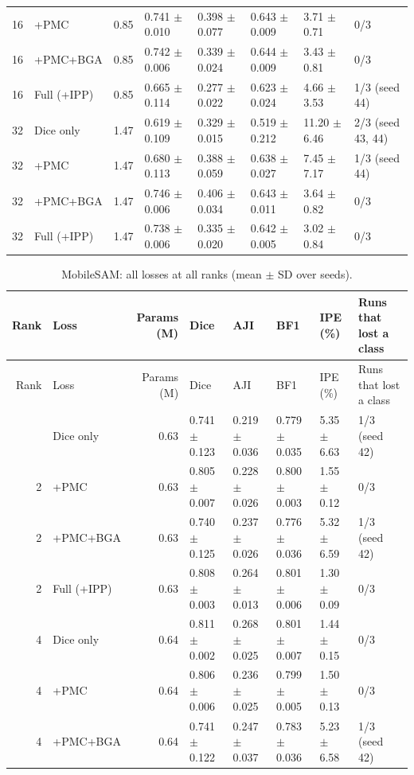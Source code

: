 \documentclass[10pt]{article}
\begin{document}
\begin{landscape}
{\begin{longtable}{r l r l l l l l}
16 & +PMC & 0.85 & 0.741 $\pm$ 0.010 & 0.398 $\pm$ 0.077 & 0.643 $\pm$ 0.009 & 3.71 $\pm$ 0.71 & 0/3 \\
16 & +PMC+BGA & 0.85 & 0.742 $\pm$ 0.006 & 0.339 $\pm$ 0.024 & 0.644 $\pm$ 0.009 & 3.43 $\pm$ 0.81 & 0/3 \\
16 & Full (+IPP) & 0.85 & 0.665 $\pm$ 0.114 & 0.277 $\pm$ 0.022 & 0.623 $\pm$ 0.024 & 4.66 $\pm$ 3.53 & 1/3 (seed 44) \\
32 & Dice only & 1.47 & 0.619 $\pm$ 0.109 & 0.329 $\pm$ 0.015 & 0.519 $\pm$ 0.212 & 11.20 $\pm$ 6.46 & 2/3 (seed 43, 44) \\
32 & +PMC & 1.47 & 0.680 $\pm$ 0.113 & 0.388 $\pm$ 0.059 & 0.638 $\pm$ 0.027 & 7.45 $\pm$ 7.17 & 1/3 (seed 44) \\
32 & +PMC+BGA & 1.47 & 0.746 $\pm$ 0.006 & 0.406 $\pm$ 0.034 & 0.643 $\pm$ 0.011 & 3.64 $\pm$ 0.82 & 0/3 \\
32 & Full (+IPP) & 1.47 & 0.738 $\pm$ 0.006 & 0.335 $\pm$ 0.020 & 0.642 $\pm$ 0.005 & 3.02 $\pm$ 0.84 & 0/3 \\
\end{longtable}
}
{\footnotesize
\begin{longtable}{r l r l l l l l}
\caption{MobileSAM: all losses at all ranks (mean $\pm$ SD over seeds).}\label{tab:abl_mobile_sam}\\
\toprule
Rank & Loss & Params (M) & Dice & AJI & BF1 & IPE (\%) & Runs that lost a class \\
\midrule
\endfirsthead
\toprule
Rank & Loss & Params (M) & Dice & AJI & BF1 & IPE (\%) & Runs that lost a class \\
\midrule
\endhead
\bottomrule
\endfoot
2 & Dice only & 0.63 & 0.741 $\pm$ 0.123 & 0.219 $\pm$ 0.036 & 0.779 $\pm$ 0.035 & 5.35 $\pm$ 6.63 & 1/3 (seed 42) \\
2 & +PMC & 0.63 & 0.805 $\pm$ 0.007 & 0.228 $\pm$ 0.026 & 0.800 $\pm$ 0.003 & 1.55 $\pm$ 0.12 & 0/3 \\
2 & +PMC+BGA & 0.63 & 0.740 $\pm$ 0.125 & 0.237 $\pm$ 0.026 & 0.776 $\pm$ 0.036 & 5.32 $\pm$ 6.59 & 1/3 (seed 42) \\
2 & Full (+IPP) & 0.63 & 0.808 $\pm$ 0.003 & 0.264 $\pm$ 0.013 & 0.801 $\pm$ 0.006 & 1.30 $\pm$ 0.09 & 0/3 \\
4 & Dice only & 0.64 & 0.811 $\pm$ 0.002 & 0.268 $\pm$ 0.025 & 0.801 $\pm$ 0.007 & 1.44 $\pm$ 0.15 & 0/3 \\
4 & +PMC & 0.64 & 0.806 $\pm$ 0.006 & 0.236 $\pm$ 0.025 & 0.799 $\pm$ 0.005 & 1.50 $\pm$ 0.13 & 0/3 \\
4 & +PMC+BGA & 0.64 & 0.741 $\pm$ 0.122 & 0.247 $\pm$ 0.037 & 0.783 $\pm$ 0.036 & 5.23 $\pm$ 6.58 & 1/3 (seed 42) \\

\end{longtable}}
\end{landscape}
\end{document}
